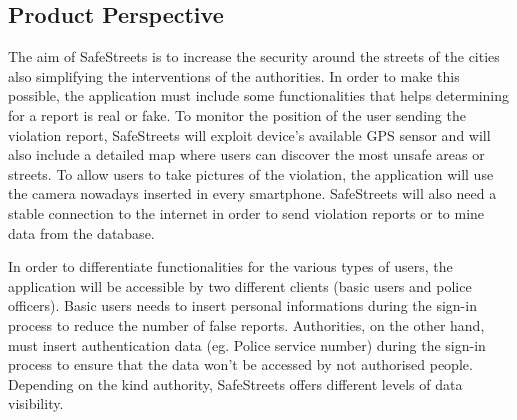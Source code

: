 \subsection{Product Perspective}
The aim of SafeStreets is to increase the security around the streets of the cities also simplifying the interventions of the authorities. \newline
In order to make this possible, the application must include some functionalities that helps determining for a report is real or fake. \newline
To monitor the position of the user sending the violation report, SafeStreets will exploit device’s available GPS sensor and will also include a detailed map where users can discover the most unsafe areas or streets. \newline
To allow users to take pictures of the violation, the application will use the camera nowadays inserted in every smartphone. \newline
SafeStreets will also need a stable connection to the internet in order to send violation reports or to mine data from the database. \newline\par
In order to differentiate functionalities for the various types of users, the application will be accessible by two different clients (basic users and police officers). \newline
Basic users needs to insert personal informations during the sign-in process to reduce the number of false reports. \newline
Authorities, on the other hand, must insert authentication data (eg. Police service number) during the sign-in process to ensure that the data won’t be accessed by not authorised people. \newline
Depending on the kind authority, SafeStreets offers different levels of data visibility.

\newpage

